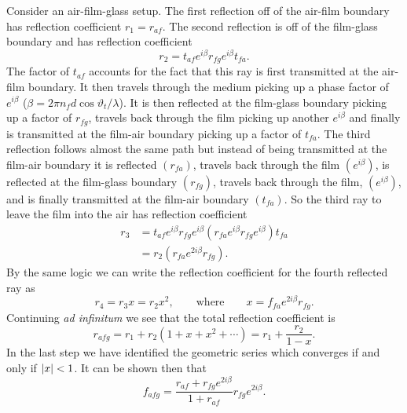    Consider an air-film-glass setup.
    The first reflection off of the air-film boundary has reflection coefficient \(r_1 = r_{af}\).
    The second reflection is off of the film-glass boundary and has reflection coefficient 
    \[r_2 = t_{af}e^{i\beta}r_{fg}e^{i\beta}t_{fa}.\]
    The factor of \(t_{af}\) accounts for the fact that this ray is first transmitted at the air-film boundary.
    It then travels through the medium picking up a phase factor of \(e^{i\beta}\) (\(\beta = 2\pi n_fd\cos\vartheta_t/\lambda\)).
    It is then reflected at the film-glass boundary picking up a factor of \(r_{fg}\), travels back through the film picking up another \(e^{i\beta}\) and finally is transmitted at the film-air boundary picking up a factor of \(t_{fa}\).
    The third reflection follows almost the same path but instead of being transmitted at the film-air boundary it is reflected \((r_{fa})\), travels back through the film \((e^{i\beta})\), is reflected at the film-glass boundary \((r_{fg})\), travels back through the film, \((e^{i\beta})\), and is finally transmitted at the film-air boundary \((t_{fa})\).
    So the third ray to leave the film into the air has reflection coefficient
    \begin{align*}
        r_3 &= t_{af}e^{i\beta}r_{fg}e^{i\beta}(r_{fa}e^{i\beta}r_{fg}e^{i\beta})t_{fa}\\
        &= r_2(r_{fa}e^{2i\beta}r_{fg}).
    \end{align*}
    By the same logic we can write the reflection coefficient for the fourth reflected ray as
    \[r_{4} = r_3x = r_2x^2, \qquad\text{where}\qquad x = f_{fa}e^{2i\beta}r_{fg}.\]
    Continuing \textit{ad infinitum} we see that the total reflection coefficient is
    \[r_{afg} = r_1 + r_2(1 + x + x^2 + \dotsb) = r_1 + \frac{r_2}{1 - x}.\]
    In the last step we have identified the geometric series which converges if and only if \(\abs{x} < 1\).
    It can be shown then that
    \[f_{afg} = \frac{r_{af} + r_{fg}e^{2i\beta}}{1 + r_{af}}r_{fg}e^{2i\beta}.\]
    
